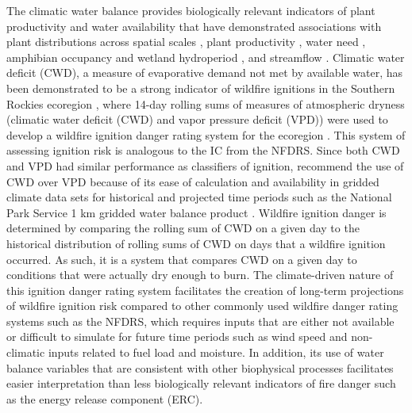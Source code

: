 \documentclass[11p]{article}
\begin{document}
The climatic water balance provides biologically relevant indicators of plant productivity and water availability that have demonstrated associations with plant distributions across spatial scales \citep{stephensonActualEvapotranspirationDeficit1998,stephensonClimaticControlVegetation1990}, plant productivity \citep{thomaSemiaridVegetationResponse2016,thomaWaterBalanceIndicator2020}, water need \citep{thomaLandscapePivotPoints2019}, amphibian occupancy and wetland hydroperiod \citep{rayMultispeciesAmphibianMonitoring2022,lafranceAmphibianRichnessRarity2024}, and streamflow \citep{thomaWaterBalanceIndicator2020}. Climatic water deficit (CWD), a measure of evaporative demand not met by available water, has been demonstrated to be a strong indicator of wildfire ignitions in the Southern Rockies ecoregion \citep{omernikEcoregionsConterminousUnited1987}, where 14-day rolling sums of measures of atmospheric dryness (climatic water deficit (CWD) and vapor pressure deficit (VPD)) were used to develop a wildfire ignition danger rating system for the ecoregion \citep{thomaWaterBalanceIndicator2020}. This system of assessing ignition risk is analogous to the IC from the NFDRS. Since both CWD and VPD had similar performance as classifiers of ignition, \citet{thomaWaterBalanceIndicator2020} recommend the use of CWD over VPD because of its ease of calculation and availability in gridded climate data sets for historical and projected time periods such as the National Park Service 1 km gridded water balance product \citep{tercekRobustProjectionsConsequences2023,tercekHistoricalChangesPlant2021} . Wildfire ignition danger is determined by comparing the rolling sum of CWD on a given day to the historical distribution of rolling sums of CWD on days that a wildfire ignition occurred. As such, it is a system that compares CWD on a given day to conditions that were actually dry enough to burn. The climate-driven nature of this ignition danger rating system facilitates the creation of long-term projections of wildfire ignition risk compared to other commonly used wildfire danger rating systems such as the NFDRS, which requires inputs that are either not available or difficult to simulate for future time periods such as wind speed and non-climatic inputs related to fuel load and moisture. In addition, its use of water balance variables that are consistent with other biophysical processes facilitates easier interpretation than less biologically relevant indicators of fire danger such as the energy release component (ERC).
\end{document}
